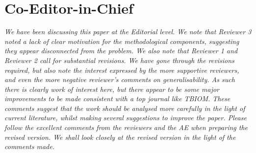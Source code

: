 \documentclass[11pt]{article}
\theoremstyle{remark}
\begin{document}
\section*{Co-Editor-in-Chief}
\textit{We have been discussing this paper at the Editorial level. We note that Reviewer 3 noted a lack of clear motivation for the methodological components, suggesting they appear disconnected from the problem. We also note that Reviewer 1 and Reviewer 2 call for substantial revisions. We have gone through the revisions required, but also note the interest expressed by the more supportive reviewers, and even the more negative reviewer's comments on generalisability. As such there is clearly work of interest here, but there appear to be some major improvements to be made consistent with a top journal like TBIOM. These comments suggest that the work should be analysed more carefully in the light of current literature, whilst making several suggestions to improve the paper. Please follow the excellent comments from the reviewers and the AE when preparing the revised version. We shall look closely at the revised version in the light of the comments made.
}
\color{black}
\end{document}
